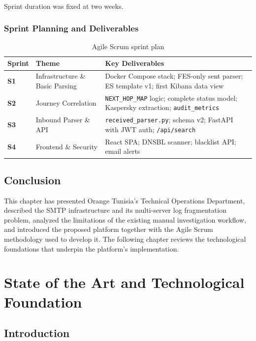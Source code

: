 \documentclass[12pt,a4paper,oneside]{report}
\newcommand{\rowA}{\rowcolor{rowgray}}
\begin{document}
Sprint duration was fixed at two weeks.

\subsection{Sprint Planning and Deliverables}

\begin{table}[H]
\centering
\caption{Agile Scrum sprint plan}
\label{tab:sprints}
\begin{tabularx}{\textwidth}{@{}>{\bfseries}p{1.6cm} p{3.8cm} X@{}}
\toprule
Sprint & Theme & Key Deliverables \\
\midrule
\rowA S1 & Infrastructure \& Basic Parsing & Docker Compose stack; FES-only sent parser; ES template v1; first Kibana data view \\
S2 & Journey Correlation & \texttt{NEXT\_HOP\_MAP} logic; complete status model; Kaspersky extraction; \texttt{audit\_metrics} \\
\rowA S3 & Inbound Parser \& API & \texttt{received\_parser.py}; schema v2; FastAPI with JWT auth; \texttt{/api/search} \\
S4 & Frontend \& Security & React SPA; DNSBL scanner; blacklist API; email alerts \\
\bottomrule
\end{tabularx}
\end{table}

\section{Conclusion}

This chapter has presented Orange Tunisia's Technical Operations Department, described the SMTP infrastructure and its multi-server log fragmentation problem, analyzed the limitations of the existing manual investigation workflow, and introduced the proposed platform together with the Agile Scrum methodology used to develop it.
The following chapter reviews the technological foundations that underpin the platform's implementation.

\chapter{State of the Art and Technological Foundation}

\section{Introduction}
\end{document}
